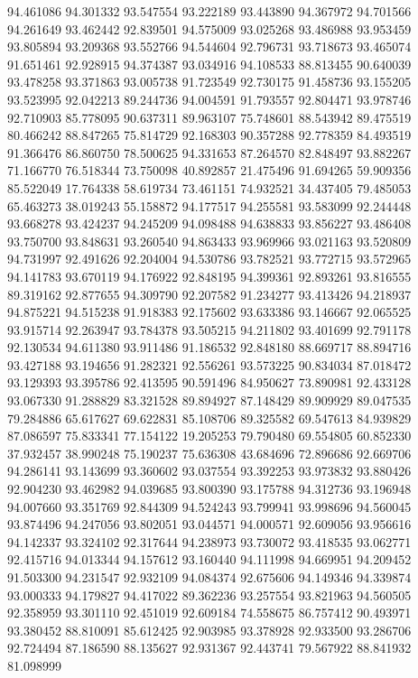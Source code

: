94.461086
94.301332
93.547554
93.222189
93.443890
94.367972
94.701566
94.261649
93.462442
92.839501
94.575009
93.025268
93.486988
93.953459
93.805894
93.209368
93.552766
94.544604
92.796731
93.718673
93.465074
91.651461
92.928915
94.374387
93.034916
94.108533
88.813455
90.640039
93.478258
93.371863
93.005738
91.723549
92.730175
91.458736
93.155205
93.523995
92.042213
89.244736
94.004591
91.793557
92.804471
93.978746
92.710903
85.778095
90.637311
89.963107
75.748601
88.543942
89.475519
80.466242
88.847265
75.814729
92.168303
90.357288
92.778359
84.493519
91.366476
86.860750
78.500625
94.331653
87.264570
82.848497
93.882267
71.166770
76.518344
73.750098
40.892857
21.475496
91.694265
59.909356
85.522049
17.764338
58.619734
73.461151
74.932521
34.437405
79.485053
65.463273
38.019243
55.158872
94.177517
94.255581
93.583099
92.244448
93.668278
93.424237
94.245209
94.098488
94.638833
93.856227
93.486408
93.750700
93.848631
93.260540
94.863433
93.969966
93.021163
93.520809
94.731997
92.491626
92.204004
94.530786
93.782521
93.772715
93.572965
94.141783
93.670119
94.176922
92.848195
94.399361
92.893261
93.816555
89.319162
92.877655
94.309790
92.207582
91.234277
93.413426
94.218937
94.875221
94.515238
91.918383
92.175602
93.633386
93.146667
92.065525
93.915714
92.263947
93.784378
93.505215
94.211802
93.401699
92.791178
92.130534
94.611380
93.911486
91.186532
92.848180
88.669717
88.894716
93.427188
93.194656
91.282321
92.556261
93.573225
90.834034
87.018472
93.129393
93.395786
92.413595
90.591496
84.950627
73.890981
92.433128
93.067330
91.288829
83.321528
89.894927
87.148429
89.909929
89.047535
79.284886
65.617627
69.622831
85.108706
89.325582
69.547613
84.939829
87.086597
75.833341
77.154122
19.205253
79.790480
69.554805
60.852330
37.932457
38.990248
75.190237
75.636308
43.684696
72.896686
92.669706
94.286141
93.143699
93.360602
93.037554
93.392253
93.973832
93.880426
92.904230
93.462982
94.039685
93.800390
93.175788
94.312736
93.196948
94.007660
93.351769
92.844309
94.524243
93.799941
93.998696
94.560045
93.874496
94.247056
93.802051
93.044571
94.000571
92.609056
93.956616
94.142337
93.324102
92.317644
94.238973
93.730072
93.418535
93.062771
92.415716
94.013344
94.157612
93.160440
94.111998
94.669951
94.209452
91.503300
94.231547
92.932109
94.084374
92.675606
94.149346
94.339874
93.000333
94.179827
94.417022
89.362236
93.257554
93.821963
94.560505
92.358959
93.301110
92.451019
92.609184
74.558675
86.757412
90.493971
93.380452
88.810091
85.612425
92.903985
93.378928
92.933500
93.286706
92.724494
87.186590
88.135627
92.931367
92.443741
79.567922
88.841932
81.098999
